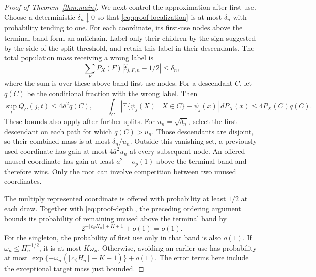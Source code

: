\documentclass[12pt]{article}
\newcommand{\E}{\mathbb E}
\begin{document}
\begin{appendix}
\begin{proof}[Proof of Theorem~\ref{thm:main}]
We next control the approximation after first use. Choose a deterministic \(\delta_n\downarrow0\) so that \eqref{eq:proof-localization} is at most \(\delta_n\) with probability tending to one. For each coordinate, its first-use nodes above the terminal band form an antichain. Label only their children by the sign suggested by the side of the split threshold, and retain this label in their descendants. The total population mass receiving a wrong label is
\[
\sum_F P_X(F)|\widehat t_{j,F,n}-1/2|\le\delta_n,
\]
where the sum is over these above-band first-use nodes. For a descendant \(C\), let \(q(C)\) be the conditional fraction with the wrong label. Then
\[
\sup_t Q_C(j,t)\le4\overline a^2q(C),
\qquad
\int_C|\E\{\psi_j(X)\mid X\in C\}-\psi_j(x)|\,dP_X(x)\le4P_X(C)q(C).
\]
These bounds also apply after further splits. For \(u_n=\sqrt{\delta_n}\), select the first descendant on each path for which \(q(C)>u_n\). Those descendants are disjoint, so their combined mass is at most \(\delta_n/u_n\). Outside this vanishing set, a previously used coordinate has gain at most \(4\overline a^2u_n\) at every subsequent node. An offered unused coordinate has gain at least \(\underline a^2-o_p(1)\) above the terminal band and therefore wins. Only the root can involve competition between two unused coordinates.

The multiply represented coordinate is offered with probability at least \(1/2\) at each draw. Together with \eqref{eq:proof-depth}, the preceding ordering argument bounds its probability of remaining unused above the terminal band by
\[
2^{-\lfloor c_\beta H_n\rfloor+K+1}+o(1)=o(1).
\]
For the singleton, the probability of first use only in that band is also \(o(1)\). If \(\omega_n\le H_n^{-1/2}\), it is at most \(K\omega_n\). Otherwise, avoiding an earlier use has probability at most \(\exp\{-\omega_n(\lfloor c_\beta H_n\rfloor-K-1)\}+o(1)\). The error terms here include the exceptional target mass just bounded.


\end{proof}
\end{appendix}
\end{document}
